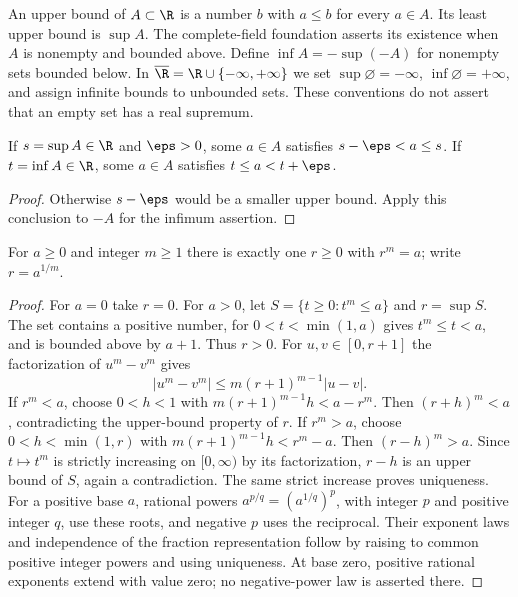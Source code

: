 \begin{definition}
An upper bound of $A\subset\R$ is a number $b$ with $a\le b$ for every $a\in A$. Its least upper bound is $\sup A$. The complete-field foundation asserts its existence when $A$ is nonempty and bounded above. Define $\inf A=-\sup(-A)$ for nonempty sets bounded below. In $\overline\R=\R\cup\{-\infty,+\infty\}$ we set $\sup\varnothing=-\infty$, $\inf\varnothing=+\infty$, and assign infinite bounds to unbounded sets. These conventions do not assert that an empty set has a real supremum.
\end{definition}
\begin{proposition}
If $s=\sup A\in\R$ and $\eps>0$, some $a\in A$ satisfies $s-\eps<a\le s$. If $t=\inf A\in\R$, some $a\in A$ satisfies $t\le a<t+\eps$.
\end{proposition}
\begin{proof}
Otherwise $s-\eps$ would be a smaller upper bound. Apply this conclusion to $-A$ for the infimum assertion.
\end{proof}

\begin{construction}
For $a\ge0$ and integer $m\ge1$ there is exactly one $r\ge0$ with $r^m=a$; write $r=a^{1/m}$.
\end{construction}
\begin{proof}
For $a=0$ take $r=0$. For $a>0$, let $S=\{t\ge0:t^m\le a\}$ and $r=\sup S$. The set contains a positive number, for $0<t<\min(1,a)$ gives $t^m\le t<a$, and is bounded above by $a+1$. Thus $r>0$. For $u,v\in[0,r+1]$ the factorization of $u^m-v^m$ gives
\[ |u^m-v^m|\le m(r+1)^{m-1}|u-v|. \]
If $r^m<a$, choose $0<h<1$ with $m(r+1)^{m-1}h<a-r^m$. Then $(r+h)^m<a$, contradicting the upper-bound property of $r$. If $r^m>a$, choose $0<h<\min(1,r)$ with $m(r+1)^{m-1}h<r^m-a$. Then $(r-h)^m>a$. Since $t\mapsto t^m$ is strictly increasing on $[0,\infty)$ by its factorization, $r-h$ is an upper bound of $S$, again a contradiction. The same strict increase proves uniqueness. For a positive base $a$, rational powers $a^{p/q}=(a^{1/q})^p$, with integer $p$ and positive integer $q$, use these roots, and negative $p$ uses the reciprocal. Their exponent laws and independence of the fraction representation follow by raising to common positive integer powers and using uniqueness. At base zero, positive rational exponents extend with value zero; no negative-power law is asserted there.
\end{proof}


